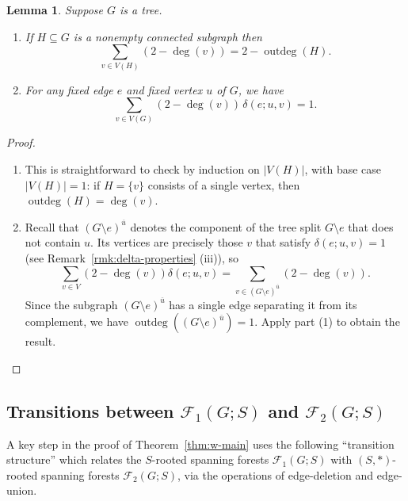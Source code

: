 \documentclass[12pt]{amsart}
\newtheorem{lem}[thm]{Lemma}
\theoremstyle{definition}
\newcommand{\trees}{\mathcal{F}_1}
\newcommand{\forests}{\mathcal{F}}
\DeclareMathOperator{\outdeg}{outdeg}
\begin{document}
\begin{lem}\label{lem:outdeg-sum}
Suppose $G$ is a tree.
\begin{enumerate}%
	\item
	If $H \subseteq G$ is a nonempty connected subgraph then
	\[
		\sum_{v \in V(H)} \left( 2 -  \deg(v) \right) = 2 - \outdeg(H) .
	\]
	\item 
	For any fixed edge $e$ and fixed vertex $u$ of $G$, we have
	\[
		\sum_{v \in V(G)} (2 - \deg(v))\, \delta(e; u,v) = 1.
	\]
\end{enumerate}
\end{lem}
\begin{proof}\hspace{0pt}
\begin{enumerate}
	\item This is straightforward to check by induction on $|V(H)|$,
	with base case $|V(H)| = 1$:
	if $H = \{v\}$ consists of a single vertex, then $\outdeg(H) = \deg(v)$.
	\item Recall that $(G \setminus e)^{\overline u}$ denotes the component of the tree split $G \setminus e$ that does not contain $u$.
	Its vertices are precisely those $v$ that satisfy $\delta(e; u, v) = 1$ (see Remark~\ref{rmk:delta-properties} (iii)), so
	\[
		\sum_{v \in V} (2 - \deg(v)) \delta(e; u,v)
		= \sum_{v \in (G \setminus e)^{\overline u}} (2 - \deg(v)) .
	\]
	Since the subgraph $(G \setminus e)^{\overline u}$ has a single edge separating it from its complement, we have
	$\outdeg((G \setminus e)^{\overline u}) = 1$.
	Apply part (1) to obtain the result.
\end{enumerate}
\end{proof}


\subsection{Transitions between $\trees(G; S)$ and $\forests_2(G; S)$}
A key step in the proof of Theorem~\ref{thm:w-main} uses the following ``transition structure'' which relates the $S$-rooted spanning forests $\trees(G; S)$ with $(S, *)$-rooted spanning forests $\forests_2(G; S)$,
via the operations of edge-deletion and edge-union.
\end{document}
